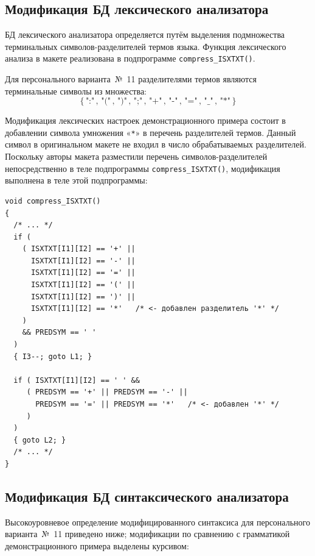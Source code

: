 \documentclass[a4paper,14pt]{extarticle}
\begin{document}
\subsection{Модификация БД лексического анализатора}

БД лексического анализатора определяется путём выделения подмножества терминальных
символов-разделителей термов языка. Функция лексического анализа в макете реализована
в подпрограмме \texttt{compress\_ISXTXT()}.

Для персонального варианта~№~11 разделителями термов являются терминальные символы
из множества:
\[
  \{\,\texttt{":"}\,,\, \texttt{"("}\,,\, \texttt{")"}\,,\, \texttt{";"}\,,\,
     \texttt{"+"}\,,\, \texttt{"-"}\,,\, \texttt{"="}\,,\, \texttt{"\_"}\,,\,
     \texttt{"*"}\,\}
\]

Модификация лексических настроек демонстрационного примера состоит в добавлении
символа умножения «\texttt{*}» в перечень разделителей термов. Данный символ в
оригинальном макете не входил в число обрабатываемых разделителей. Поскольку авторы
макета разместили перечень символов-разделителей непосредственно в теле подпрограммы
\texttt{compress\_ISXTXT()}, модификация выполнена в теле этой подпрограммы:

\begin{lstlisting}[style=Cstyle,caption={Фрагмент \texttt{compress\_ISXTXT()} с добавленным символом «\texttt{*}»},label=lst:lex]
void compress_ISXTXT()
{
  /* ... */
  if (
    ( ISXTXT[I1][I2] == '+' ||
      ISXTXT[I1][I2] == '-' ||
      ISXTXT[I1][I2] == '=' ||
      ISXTXT[I1][I2] == '(' ||
      ISXTXT[I1][I2] == ')' ||
      ISXTXT[I1][I2] == '*'   /* <- добавлен разделитель '*' */
    )
    && PREDSYM == ' '
  )
  { I3--; goto L1; }

  if ( ISXTXT[I1][I2] == ' ' &&
     ( PREDSYM == '+' || PREDSYM == '-' ||
       PREDSYM == '=' || PREDSYM == '*'   /* <- добавлен '*' */
     )
  )
  { goto L2; }
  /* ... */
}
\end{lstlisting}

\subsection{Модификация БД синтаксического анализатора}

Высокоуровневое определение модифицированного синтаксиса для персонального
варианта~№~11 приведено ниже; модификации по сравнению с грамматикой
демонстрационного примера выделены курсивом:
\end{document}
